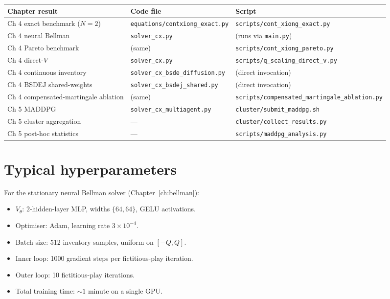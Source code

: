 \begin{table}[h]
\centering
\small
\begin{tabular}{@{}lll@{}}
\toprule
Chapter result & Code file & Script \\ \midrule
Ch 4 exact benchmark ($N=2$) & \texttt{equations/contxiong\_exact.py} & \texttt{scripts/cont\_xiong\_exact.py} \\
Ch 4 neural Bellman & \texttt{solver\_cx.py} & (runs via \texttt{main.py}) \\
Ch 4 Pareto benchmark & (same) & \texttt{scripts/cont\_xiong\_pareto.py} \\
Ch 4 direct-$V$ & \texttt{solver\_cx.py} & \texttt{scripts/q\_scaling\_direct\_v.py} \\
Ch 4 continuous inventory & \texttt{solver\_cx\_bsde\_diffusion.py} & (direct invocation) \\
Ch 4 BSDEJ shared-weights & \texttt{solver\_cx\_bsdej\_shared.py} & (direct invocation) \\
Ch 4 compensated-martingale ablation & (same) & \texttt{scripts/compensated\_martingale\_ablation.py} \\
Ch 5 MADDPG & \texttt{solver\_cx\_multiagent.py} & \texttt{cluster/submit\_maddpg.sh} \\
Ch 5 cluster aggregation & --- & \texttt{cluster/collect\_results.py} \\
Ch 5 post-hoc statistics & --- & \texttt{scripts/maddpg\_analysis.py} \\ \bottomrule
\end{tabular}
\end{table}

\section{Typical hyperparameters}

For the stationary neural Bellman solver (Chapter~\ref{ch:bellman}):
\begin{itemize}[leftmargin=2em]
  \item $V_\theta$: 2-hidden-layer MLP, widths $\{64, 64\}$, GELU activations.
  \item Optimiser: Adam, learning rate $3 \times 10^{-4}$.
  \item Batch size: 512 inventory samples, uniform on $[-Q, Q]$.
  \item Inner loop: 1000 gradient steps per fictitious-play iteration.
  \item Outer loop: 10 fictitious-play iterations.
  \item Total training time: $\sim 1$ minute on a single GPU.
\end{itemize}

